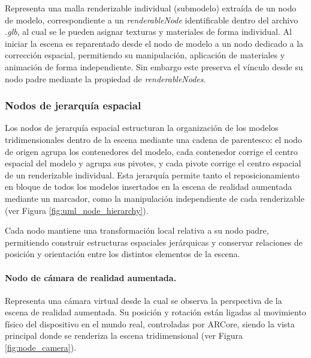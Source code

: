                     Representa una malla renderizable individual (submodelo) extraída de un nodo de modelo, correspondiente a un \textit{renderableNode} identificable dentro del archivo \textit{.glb}, al cual se le pueden asignar texturas y materiales de forma individual. Al iniciar la escena es reparentado desde el nodo de modelo a un nodo dedicado a la corrección espacial, permitiendo su manipulación, aplicación de materiales y animación de forma independiente. Sin embargo este preserva el vínculo desde su nodo padre mediante la propiedad de \textit{renderableNodes}.
        \subsubsection{Nodos de jerarquía espacial}

            Los nodos de jerarquía espacial estructuran la organización de los modelos tridimensionales dentro de la escena mediante una cadena de parentesco: el nodo de origen agrupa los contenedores del modelo, cada contenedor corrige el centro espacial del modelo y agrupa sus pivotes, y cada pivote corrige el centro espacial de un renderizable individual. Esta jerarquía permite tanto el reposicionamiento en bloque de todos los modelos insertados en la escena de realidad aumentada mediante un marcador, como la manipulación independiente de cada renderizable (ver Figura \ref{fig:uml_node_hierarchy}).

            

            Cada nodo mantiene una transformación local relativa a su nodo padre, permitiendo construir estructuras espaciales jerárquicas y conservar relaciones de posición y orientación entre los distintos elementos de la escena.

            \paragraph{Nodo de cámara de realidad aumentada.}

                Representa una cámara virtual desde la cual se observa la perspectiva de la escena de realidad aumentada. Su posición y rotación están ligadas al movimiento físico del dispositivo en el mundo real, controladas por ARCore, siendo la vista principal donde se renderiza la escena tridimensional (ver Figura \ref{fig:node_camera}).

                

